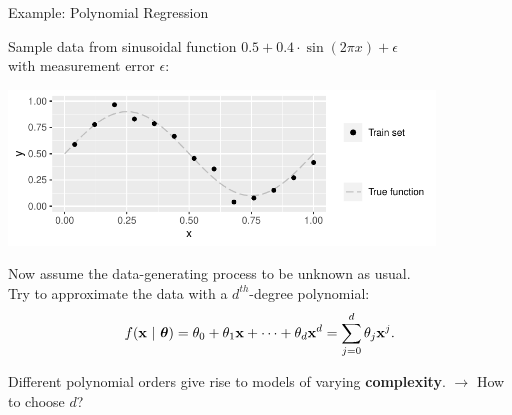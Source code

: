 
\begin{vbframe}{Example: Polynomial Regression}

Sample data from sinusoidal function
$0.5 + 0.4 \cdot \sin (2 \pi x) + \epsilon$\\
with measurement error $\epsilon$:

\vfill

\begin{center}
  \includegraphics[width=0.85\textwidth]{figure/eval_train_1}
\end{center}

Now assume the data-generating process to be unknown as usual.\\
Try to approximate the data with a $d^{th}$-degree polynomial:
\[ f(\mathbf{x} ~|~ \bm{\theta}) = \theta_0 + \theta_1 \mathbf{x} + \cdots + \theta_d \mathbf{x}^d = \sum_{j = 0}^{d}
\theta_j \mathbf{x}^j\text. \]

\framebreak

Different polynomial orders give rise to models of varying \textbf{complexity}.
$\rightarrow$ How to choose $d$?

\vfill


\end{vbframe}
